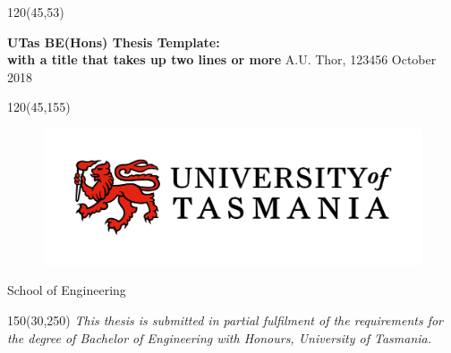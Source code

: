 

\begin{textblock}{120}(45,53) %
\noindent\begin{minipage}[t][55mm][c]{\textwidth} 
\centering \Large  %
\vspace*{\fill}
{\bf UTas BE(Hons) Thesis Template:\\ with a title that takes up two lines or more}
\vfill
A.U. Thor, 123456 
\vfill
\large October 2018
\vspace*{\fill}
\end{minipage}
\end{textblock}

\begin{textblock}{120}(45,155)
\centering
\begin{figure}[h]
\centering\includegraphics[width=0.75\linewidth]{UTAS-Logo-colour-2018.jpg}
\end{figure}
\vspace{2cm}
\Large
School of Engineering


\end{textblock}


\begin{textblock}{150}(30,250)
\centering
\emph{This thesis is submitted in partial fulfilment of the requirements for the degree of
Bachelor of Engineering with Honours,
University of Tasmania.}
\end{textblock}



